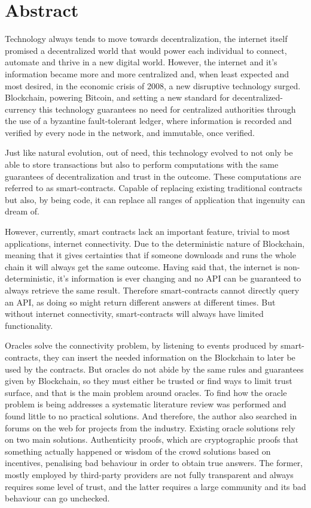 \chapter*{Abstract}


Technology always tends to move towards decentralization, the internet itself promised a decentralized world that would power each individual to connect, automate and thrive in a new digital world. However, the internet and it's information became more and more centralized and, when least expected and most desired, in the economic crisis of 2008, a new disruptive technology surged. Blockchain, powering Bitcoin, and setting a new standard for decentralized-currency this technology guarantees no need for centralized authorities through the use of a byzantine fault-tolerant ledger, where information is recorded and verified by every node in the network, and immutable, once verified.

Just like natural evolution, out of need, this technology evolved to not only be able to store transactions but also to perform computations with the same guarantees of decentralization and trust in the outcome. These computations are referred to as smart-contracts. Capable of replacing existing traditional contracts but also, by being code, it can replace all ranges of application that ingenuity can dream of.

However, currently, smart contracts lack an important feature, trivial to most applications, internet connectivity. Due to the deterministic nature of Blockchain, meaning that it gives certainties that if someone downloads and runs the whole chain it will always get the same outcome. Having said that, the internet is non-deterministic, it's information is ever changing and no API can be guaranteed to always retrieve the same result. Therefore smart-contracts cannot directly query an API, as doing so might return different answers at different times. But without internet connectivity, smart-contracts will always have limited functionality.

Oracles solve the connectivity problem, by listening to events produced by smart-contracts, they can insert the needed information on the Blockchain to later be used by the contracts. But oracles do not abide by the same rules and guarantees given by Blockchain, so they must either be trusted or find ways to limit trust surface, and that is the main problem around oracles. To find how the oracle problem is being addresses a systematic literature review was performed and found little to no practical solutions. And therefore, the author also searched in forums on the web for projects from the industry. Existing oracle solutions rely on two main solutions. Authenticity proofs, which are cryptographic proofs that something actually happened or wisdom of the crowd solutions based on incentives, penalising bad behaviour in order to obtain true answers. The former, mostly employed by third-party providers are not fully transparent and always requires some level of trust, and the latter requires a large community and its bad behaviour can go unchecked.

